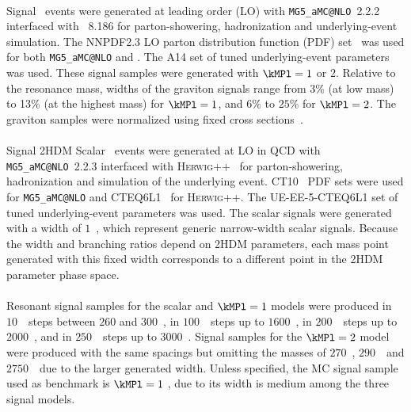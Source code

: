 \paragraph{}
Signal \Gtohhb\ events were generated at leading order (LO) with \texttt{MG5\_aMC@NLO}~2.2.2~\cite{MGaMCatNLO} interfaced with \pythia~8.186 for parton-showering, hadronization and underlying-event simulation. 
The NNPDF2.3 LO parton distribution function (PDF) set~\cite{Ball:2012cx} was used for both \texttt{MG5\_aMC@NLO} and \pythia. 
The A14 set of tuned underlying-event parameters was used. 
These signal samples were generated with $\kMPl = 1$ or $2$.
Relative to the resonance mass, widths of the graviton signals range from 3\% (at low mass) to 13\% (at the highest mass) for $\kMPl=1$, and $6\%$ to $25\%$ for $\kMPl=2$.
The graviton samples were normalized using fixed cross sections~\cite{carvalho}.

\paragraph{}
Signal 2HDM Scalar \tohhb\ events were generated at LO in QCD with \texttt{MG5\_aMC@NLO}~2.2.3 interfaced with \textsc{Herwig++}~\cite{Bahr:2008pv} for parton-showering, hadronization and simulation of the underlying event. CT10~\cite{Lai:2010vv} PDF sets were used for \texttt{MG5\_aMC@NLO} and CTEQ6L1~\cite{cteq6l1} for \textsc{Herwig++}.
The UE-EE-5-CTEQ6L1 set of tuned underlying-event parameters \cite{Seymour:2013qka} was used. 
The scalar signals were generated with a width of $1$~\GeV, which represent generic narrow-width scalar signals. 
Because the width and branching ratios depend on 2HDM parameters, each mass point generated with this fixed width corresponds to a different point in the 2HDM parameter phase space.

\paragraph{}
Resonant signal samples for the scalar and $\kMPl=1$ models were produced in $10$~\GeV\ steps between $260$ and $300$~\GeV, in $100$~\GeV\ steps up to $1600$~\GeV, in $200$~\GeV\ steps up to $2000$~\GeV, and in $250$~\GeV\ steps up to $3000$~\GeV. Signal samples for the $\kMPl=2$ model were produced with the same spacings but omitting the masses of $270$~\GeV, $290$~\GeV\ and $2750$~\GeV\ due to the larger generated width. Unless specified, the MC signal sample used as benchmark is $\kMPl=1$ \Grav, due to its width is medium among the three signal models.

